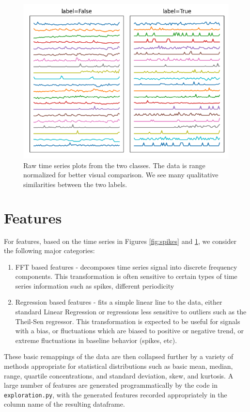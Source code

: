 \documentclass[12pt]{article}
\begin{document}
\begin{figure}
\centering
\includegraphics[width=1\textwidth]{exploration.png}
\caption{Raw time series plots from the two classes. The data is range normalized for better visual comparison. We see many qualitative similarities between the two labels.}
\label{fig:exploration}
\end{figure}
\clearpage
\section{Features}
For features, based on the time series in Figures \ref{fig:spikes} and \ref{fig:exploration}, we consider the following major categories:
\begin{enumerate}
\item{FFT based features - decomposes time series signal into discrete frequency components. This transformation is often sensitive to certain types of time series information such as spikes, different periodicity}
\item{Regression based features - fits a simple linear line to the data, either standard Linear Regression or regressions less sensitive to outliers such as the Theil-Sen regressor. This transformation is expected to be useful for signals with a bias, or fluctuations which are biased to positive or negative trend, or extreme fluctuations in baseline behavior (spikes, etc). }
\end{enumerate}
These basic remappings of the data are then collapsed further by a variety of methods appropriate for statistical distributions such as basic mean, median, range, quartile concentrations, and standard deviation, skew, and kurtosis. A large number of features are generated programmatically by the code in \verb|exploration.py|, with the generated features recorded appropriately in the column name of the resulting dataframe. 
\end{document}
